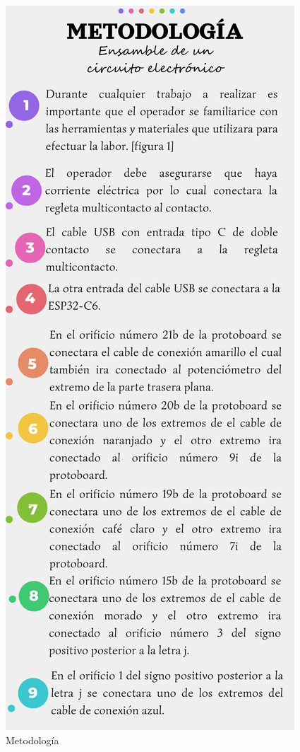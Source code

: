     \begin{figure}[H]
        \centering
        \includegraphics[trim = {5mm 10mm 5mm 50mm},clip,scale=0.4]{16/Img/instructivoCE(1).pdf}
        \caption{Metodología}
        \label{fig:InstructivoCE1)}
    \end{figure}
